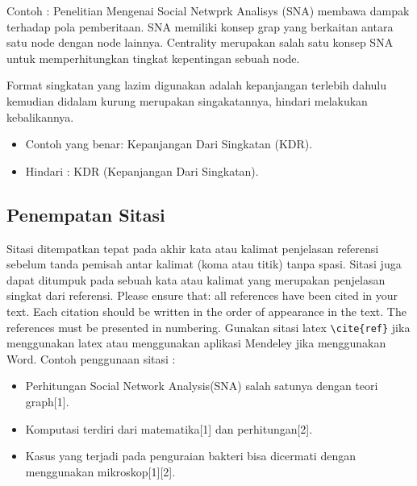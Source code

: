 Contoh : Penelitian Mengenai Social Netwprk Analisys (SNA) membawa dampak terhadap pola pemberitaan. SNA memiliki konsep grap yang berkaitan antara satu node dengan node lainnya. Centrality merupakan salah satu konsep SNA untuk memperhitungkan tingkat kepentingan sebuah node.

Format singkatan yang lazim digunakan adalah kepanjangan terlebih dahulu kemudian didalam kurung merupakan singakatannya, hindari melakukan kebalikannya. 
\begin{itemize}
\item Contoh yang benar: Kepanjangan Dari Singkatan (KDR). 
\item Hindari : KDR (Kepanjangan Dari Singkatan).
\end{itemize}

\subsection{Penempatan Sitasi}
Sitasi ditempatkan tepat pada akhir kata atau kalimat penjelasan referensi sebelum tanda 
pemisah antar kalimat (koma atau titik) tanpa spasi. 
Sitasi juga dapat ditumpuk pada sebuah kata atau kalimat yang merupakan  penjelasan singkat dari referensi. 
Please ensure that: all references have been cited in your text. Each citation should be written in the order of appearance in the text. The references must be presented in numbering. Gunakan sitasi latex \verb|\cite{ref}| jika menggunakan latex atau menggunakan aplikasi Mendeley jika menggunakan Word. Contoh penggunaan sitasi :
\begin{itemize}
\item Perhitungan Social Network Analysis(SNA) salah satunya dengan teori graph[1].
\item Komputasi terdiri dari matematika[1] dan perhitungan[2].
\item Kasus yang terjadi pada penguraian bakteri bisa dicermati dengan menggunakan mikroskop[1][2].
\end{itemize}

